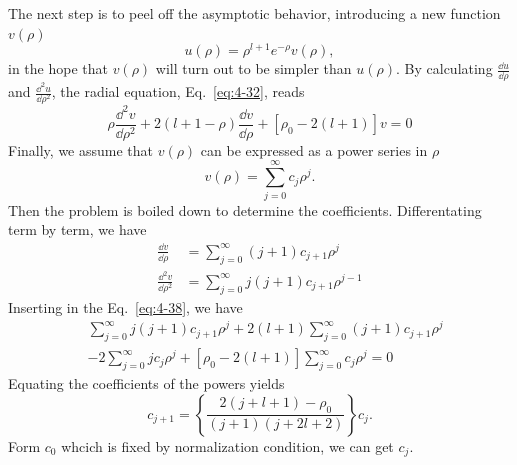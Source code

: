 The next step is to peel off the asymptotic behavior, introducing a new function $v \left( \rho \right)$
\begin{equation}
  \label{eq:4-37}
  u \left( \rho \right) = \rho^{l+1} e^{-\rho} v \left( \rho \right),
\end{equation}
in the hope that $v \left( \rho \right)$ will turn out to be simpler than $u \left( \rho \right)$.
By calculating $\frac{\dd u}{\dd \rho}$ and $\frac{\dd^{2} u}{\dd \rho^{2}}$, the radial equation, Eq.~\eqref{eq:4-32}, reads
\begin{equation}
  \label{eq:4-38}
  \rho \frac{\dd^{2} v}{\dd \rho^{2}} + 2 \left( l+1 -\rho \right) \frac{\dd v}{\dd \rho} + \left[ \rho_0 - 2 \left( l+1 \right) \right]v =0
\end{equation}
Finally, we assume that $v \left( \rho \right)$ can be expressed as a power series in $\rho$
\begin{equation}
  \label{eq:4-39}
  v \left( \rho \right) = \sum_{j=0}^{\infty} c_j \rho^j.
\end{equation}
Then the problem is boiled down to determine the coefficients.
Differentating term by term, we have
\begin{align*}
  \frac{\dd v}{\dd \rho} &= \sum_{j=0}^{\infty} \left( j+1 \right) c_{j+1} \rho^{j} \\
  \frac{\dd^{2} v}{\dd \rho^2} &= \sum_{j=0}^{\infty} j \left( j+1 \right) c_{j+1} \rho^{j-1}
\end{align*}
Inserting in the Eq.~\eqref{eq:4-38}, we have
\begin{align*}
  &\sum_{j=0}^{\infty} j \left( j+1 \right) c_{j+1} \rho^j + 2 \left( l+1 \right) \sum_{j=0}^{\infty} \left( j+1 \right) c_{j+1} \rho^j \\
  &- 2 \sum_{j=0}^{\infty} j c_j \rho^j + \left[ \rho_0 -2 \left( l+1 \right) \right] \sum_{j=0}^{\infty} c_j\rho^j =0
\end{align*}
Equating the coefficients of the powers yields
\begin{equation}
  \label{eq:4-40}
  c_{j+1} = \left\{ \frac{2 \left(j+l+1\right) - \rho_{0}}{\left(j+1\right) \left(j+2l+2\right)} \right\} c_{j}.
\end{equation}
Form $c_{0}$ whcich is fixed by normalization condition, we can get $c_{j}$.

